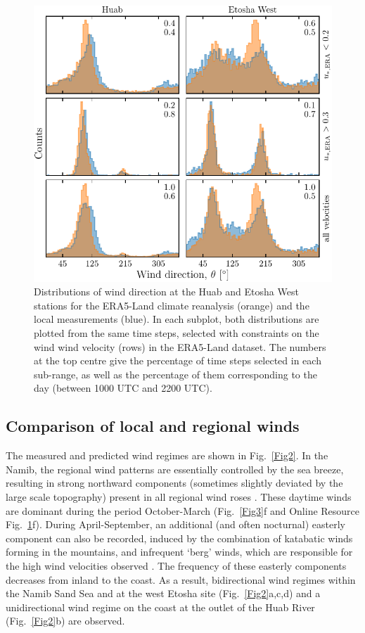 \begin{figure}
\centering
\includegraphics[scale=1]{Figures/Figure4.pdf}
\caption{Distributions of wind direction at the Huab and Etosha West stations for the
ERA5-Land climate reanalysis (orange) and the local measurements (blue). In each subplot,
both distributions are plotted from the same time steps, selected with constraints on the
wind wind velocity (rows) in the ERA5-Land dataset. The numbers at the top centre give
the percentage of time steps selected in each sub-range, as well as the percentage of them
corresponding to the day (between 1000 UTC and 2200 UTC).}
\label{Fig4}
\end{figure}

\subsection{Comparison of local and regional winds}
\label{section_data_feedback}
The measured and predicted wind regimes are shown in Fig.~\ref{Fig2}. In the Namib, the regional wind patterns are essentially controlled by the sea breeze, resulting in strong northward components (sometimes slightly deviated by the large scale topography) present in all regional wind roses \citep{lancaster1985}. These daytime winds are dominant during the period October-March (Fig.~\ref{Fig3}f and Online Resource Fig.~\ref{Fig4}f). During April-September, an additional (and often nocturnal) easterly component can also be recorded, induced by the combination of katabatic winds forming in the mountains, and infrequent `berg' winds, which are responsible for the high wind velocities observed \citep{lancaster1984}. The frequency of these easterly components decreases from inland to the coast. As a result, bidirectional wind regimes within the Namib Sand Sea and at the west Etosha site (Fig.~\ref{Fig2}a,c,d) and a unidirectional wind regime on the coast at the outlet of the Huab River (Fig.~\ref{Fig2}b) are observed.

